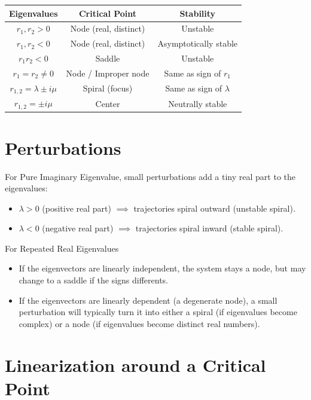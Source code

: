 \renewcommand{\arraystretch}{1.1} %
\begin{tabular}{|c|c|c|}
\hline
\textbf{Eigenvalues} & \textbf{Critical Point} & \textbf{Stability} \\
\hline
$r_1, r_2 > 0$ & Node (real, distinct) & Unstable \\
$r_1, r_2 < 0$ & Node (real, distinct) & Asymptotically stable \\
$r_1 r_2 < 0$ & Saddle & Unstable \\
$r_1 = r_2 \neq 0$ & Node / Improper node & Same as sign of $r_1$ \\
$r_{1,2} = \lambda \pm i\mu$ & Spiral (focus) & Same as sign of $\lambda$ \\
$r_{1,2} = \pm i\mu$ & Center & Neutrally stable \\
\hline
\end{tabular}

\section*{Perturbations}

For Pure Imaginary Eigenvalue,  
small perturbations add a tiny real part to the eigenvalues:

\begin{itemize}
    \item $\lambda > 0$ (positive real part) $\implies$ trajectories spiral outward (unstable spiral).
    \item $\lambda < 0$ (negative real part) $\implies$ trajectories spiral inward (stable spiral).
\end{itemize}

For Repeated Real Eigenvalues

\begin{itemize}
    \item If the eigenvectors are linearly independent, the system stays a node, but may change to a saddle if the signs differents.
    \item If the eigenvectors are linearly dependent (a degenerate node), 
    a small perturbation will typically turn it into either a spiral 
    (if eigenvalues become complex) or a node 
    (if eigenvalues become distinct real numbers).
\end{itemize}

\section*{Linearization around a Critical Point}

